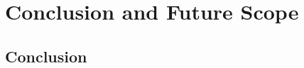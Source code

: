 
\chapter{Conclusion and Future Scope}\doublespacing %

\label{Chapter7} %




\section{Conclusion}
